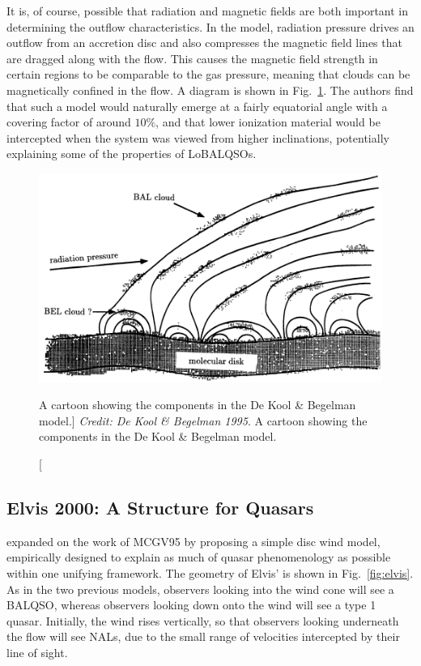 It is, of course, possible that radiation and magnetic fields are both important
in determining the outflow characteristics. In the \cite{dekool1995} model, radiation
pressure drives an outflow from an accretion disc and also compresses the magnetic
field lines that are dragged along with the flow. This causes the magnetic field
strength in certain regions to be comparable to the gas pressure, meaning that clouds
can be magnetically confined in the flow. A diagram is shown in Fig.~\ref{fig:dekool}.
The authors find that such a model would naturally emerge at a fairly equatorial
angle with a covering factor of around $10\%$, and that lower ionization material 
would be intercepted when the system was viewed from higher inclinations, potentially
explaining some of the properties of LoBALQSOs.  

\begin{figure}
\centering
\includegraphics[width=1.0\textwidth]{figures/02-outflows/dekool.png}
\caption
[A cartoon showing the components in the De Kool \& Begelman model.]
{
{\sl Credit: De Kool \& Begelman 1995}. 
A cartoon showing the components in the De Kool \& Begelman model.
} 
\label{fig:dekool}
\end{figure}


\subsection{Elvis 2000: A Structure for Quasars}
\cite{elvis2000} expanded on the work of MCGV95 by proposing a simple
disc wind model, empirically designed to explain as much of quasar phenomenology
as possible within one unifying framework. The geometry of Elvis'
is shown in Fig.~\ref{fig:elvis}. As in the two previous models, observers 
looking into the wind cone will see a BALQSO, whereas observers looking down onto
the wind will see a type 1 quasar. Initially, the wind rises vertically, so
that observers looking underneath the flow will see NALs,
due to the small range of velocities intercepted by their line of sight. 

